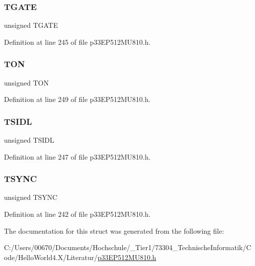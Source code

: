 \subsubsection{\texorpdfstring{T\+G\+A\+TE}{TGATE}}
{\footnotesize\ttfamily unsigned T\+G\+A\+TE}



Definition at line 245 of file p33\+E\+P512\+M\+U810.\+h.

\mbox{\label{structtag_t1_c_o_n_b_i_t_s_a8c2a094047d1019ce1c5b25ea8cff9b3}} 
\subsubsection{\texorpdfstring{T\+ON}{TON}}
{\footnotesize\ttfamily unsigned T\+ON}



Definition at line 249 of file p33\+E\+P512\+M\+U810.\+h.

\mbox{\label{structtag_t1_c_o_n_b_i_t_s_a4971b881615ef42703b5b78179fcda3d}} 
\subsubsection{\texorpdfstring{T\+S\+I\+DL}{TSIDL}}
{\footnotesize\ttfamily unsigned T\+S\+I\+DL}



Definition at line 247 of file p33\+E\+P512\+M\+U810.\+h.

\mbox{\label{structtag_t1_c_o_n_b_i_t_s_ada7785ffcd6dd85209227b6645102eaf}} 
\subsubsection{\texorpdfstring{T\+S\+Y\+NC}{TSYNC}}
{\footnotesize\ttfamily unsigned T\+S\+Y\+NC}



Definition at line 242 of file p33\+E\+P512\+M\+U810.\+h.



The documentation for this struct was generated from the following file\+:\begin{DoxyCompactItemize}
\item 
C\+:/\+Users/00670/\+Documents/\+Hochschule/\+\_\+\+Tier1/73304\+\_\+\+Technische\+Informatik/\+Code/\+Hello\+World4.\+X/\+Literatur/\hyperlink{p33_e_p512_m_u810_8h}{p33\+E\+P512\+M\+U810.\+h}\end{DoxyCompactItemize}
